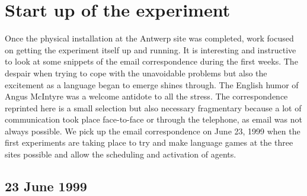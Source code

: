 \section{Start up of the experiment} 

Once the physical installation at the Antwerp site was completed, work focused on getting the experiment itself 
up and running. It is interesting and instructive to look at some snippets of the email correspondence during the 
first weeks. The despair when trying to cope with the unavoidable problems but also the excitement 
as a language began to emerge shines through. The English humor of Angus McIntyre was a welcome antidote to 
all the stress. The correspondence reprinted here is a small selection but also necessary fragmentary because a 
lot of communication took place face-to-face or through the telephone, as email was not always possible. 
\enlargethispage{1\baselineskip}
We pick up the email correspondence on
June 23, 1999 when the first experiments are taking place to try and make language games at the three sites possible 
and allow the scheduling and activation of agents. 

\subsection*{23 June 1999}

